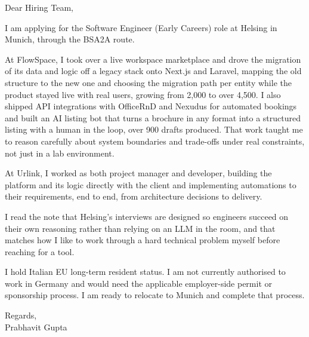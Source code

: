 \documentclass[a4paper,11pt]{article}
\begin{document}
Dear Hiring Team,

I am applying for the Software Engineer (Early Careers) role at Helsing in Munich, through the BSA2A route.

At FlowSpace, I took over a live workspace marketplace and drove the migration of its data and logic off a legacy stack onto Next.js and Laravel, mapping the old structure to the new one and choosing the migration path per entity while the product stayed live with real users, growing from 2,000 to over 4,500. I also shipped API integrations with OfficeRnD and Nexudus for automated bookings and built an AI listing bot that turns a brochure in any format into a structured listing with a human in the loop, over 900 drafts produced. That work taught me to reason carefully about system boundaries and trade-offs under real constraints, not just in a lab environment.

At Urlink, I worked as both project manager and developer, building the platform and its logic directly with the client and implementing automations to their requirements, end to end, from architecture decisions to delivery.

I read the note that Helsing's interviews are designed so engineers succeed on their own reasoning rather than relying on an LLM in the room, and that matches how I like to work through a hard technical problem myself before reaching for a tool.

I hold Italian EU long-term resident status. I am not currently authorised to work in Germany and would need the applicable employer-side permit or sponsorship process. I am ready to relocate to Munich and complete that process.

Regards,\\
Prabhavit Gupta
\end{document}
